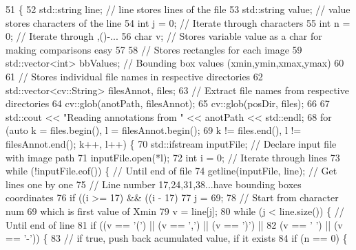 \begin{DoxyCode}
51                                                                         \{
52     std::string line;  \textcolor{comment}{// line stores lines of the file}
53     std::string value;  \textcolor{comment}{// value stores characters of the line}
54     \textcolor{keywordtype}{int} j = 0;  \textcolor{comment}{// Iterate through characters}
55     \textcolor{keywordtype}{int} n = 0;  \textcolor{comment}{// Iterate through ,()-...}
56     \textcolor{keywordtype}{char} v;  \textcolor{comment}{// Stores variable value as a char for making comparisons easy}
57 
58     \textcolor{comment}{// Stores rectangles for each image}
59     std::vector<int> bbValues;  \textcolor{comment}{// Bounding box values (xmin,ymin,xmax,ymax)}
60 
61     \textcolor{comment}{// Stores individual file names in respective directories}
62     std::vector<cv::String> filesAnnot, files;
63     \textcolor{comment}{// Extract file names from respective directories}
64     cv::glob(anotPath, filesAnnot);
65     cv::glob(posDir, files);
66 
67     std::cout << \textcolor{stringliteral}{"Reading annotations from "} << anotPath << std::endl;
68     \textcolor{keywordflow}{for} (\textcolor{keyword}{auto} k = files.begin(), l = filesAnnot.begin();
69               k != files.end(), l != filesAnnot.end(); k++, l++) \{
70         std::ifstream inputFile;  \textcolor{comment}{// Declare input file with image path}
71         inputFile.open(*l);
72         \textcolor{keywordtype}{int} i = 0;  \textcolor{comment}{// Iterate through lines}
73         \textcolor{keywordflow}{while} (!inputFile.eof()) \{  \textcolor{comment}{// Until end of file}
74             getline(inputFile, line);  \textcolor{comment}{// Get lines one by one}
75             \textcolor{comment}{// Line number 17,24,31,38...have bounding boxes coordinates}
76             \textcolor{keywordflow}{if} ((i >= 17) && ((i - 17) %
77                 j = 69;
78                 \textcolor{comment}{// Start from character num 69 which is first value of Xmin}
79                 v = line[j];
80                 \textcolor{keywordflow}{while} (j < line.size()) \{  \textcolor{comment}{// Until end of line}
81                     \textcolor{keywordflow}{if} ((v == \textcolor{charliteral}{'('}) || (v == \textcolor{charliteral}{','}) || (v == \textcolor{charliteral}{')'}) ||
82                         (v == \textcolor{charliteral}{' '}) || (v == \textcolor{charliteral}{'-'})) \{
83                     \textcolor{comment}{// if true, push back acumulated value, if it exists}
84                         \textcolor{keywordflow}{if} (n == 0) \{

\end{DoxyCode}
